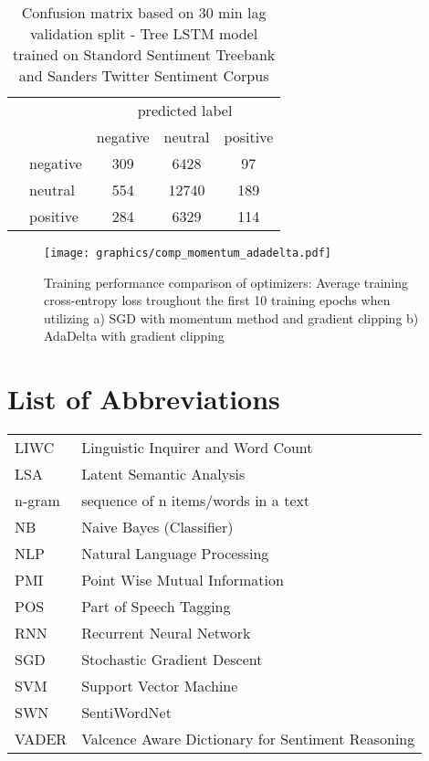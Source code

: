 \documentclass[a4paper,12pt]{article}%
\begin{document}
\begin{table}[H]
\centering
\captionsetup{justification=centering}
 \begin{tabular}{|c|l|c|c|c|}
 \cline{1-5}
 \multicolumn{2}{|c|}{} & \multicolumn{3}{c|}{predicted label} \\ \cline{3-5}
 \multicolumn{2}{|c|}{} & \multicolumn{1}{c|}{negative} & \multicolumn{1}{c|}{neutral} & \multicolumn{1}{c|}{positive} \\
 \hline
 \parbox[t]{2mm}{} & negative & 309 & 6428 & 97\\
 & neutral & 554 & 12740 & 189\\
 & positive & 284 & 6329 & 114\\
 \hline
 \end{tabular}
\caption{Confusion matrix based on 30 min lag validation split - Tree LSTM model trained on Standord Sentiment Treebank and Sanders Twitter Sentiment Corpus \label{table:conf_matrix_1}}
\end{table}


\begin{figure}
\captionsetup{justification=centering}
\centering
\texttt{[image: graphics/comp\_momentum\_adadelta.pdf]}
\caption{Training performance comparison of optimizers: Average training cross-entropy loss troughout the first 10 training epochs when utilizing a) SGD with momentum method and gradient clipping b) AdaDelta with gradient clipping\label{fig:comp_momentum_adadelta}}
\end{figure}

\newpage
\section*{List of Abbreviations}
\begin{longtable}[l]{p{60pt} p{500pt}}
LIWC & Linguistic Inquirer and Word Count \\
LSA 	& Latent Semantic Analysis \\
n-gram & sequence of n items/words in a text \\
NB & Naive Bayes (Classifier) \\
NLP 	& Natural Language Processing \\
PMI 	& Point Wise Mutual Information \\
POS & Part of Speech Tagging \\
RNN 	& Recurrent Neural Network	 \\
SGD	& Stochastic Gradient Descent \\
SVM & Support Vector Machine \\
SWN & SentiWordNet \\
VADER & Valcence Aware Dictionary for Sentiment Reasoning
\end{longtable}
\end{document}
